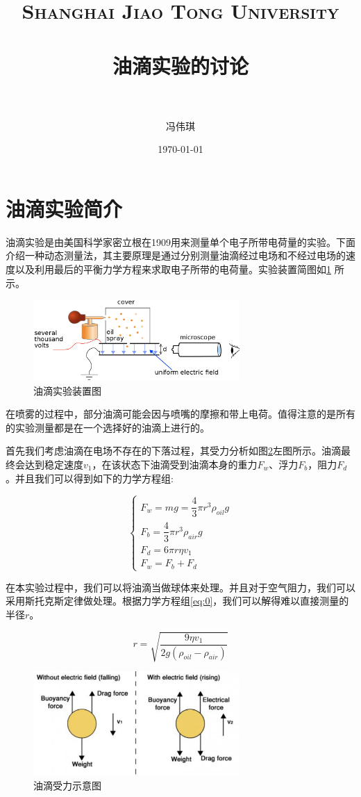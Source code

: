 \documentclass[paper=a4, fontsize=11pt]{scrartcl} %
\title{	
\normalfont \normalsize 
\textsc{Shanghai Jiao Tong University} \\ [25pt] %
\horrule{0.5pt} \\[0.4cm] %
\huge \kaishu 油滴实验的讨论 \\ %
\horrule{2pt} \\[0.5cm] %
}
\author{\kaishu 冯伟琪} %
\date{\normalsize\today} %
\numberwithin{equation}{section} %
\numberwithin{figure}{section} %
\numberwithin{table}{section} %
\begin{document}
\maketitle %
\section{\kaishu 油滴实验简介}
\kaishu 
油滴实验是由美国科学家密立根在1909用来测量单个电子所带电荷量的实验。下面介绍一种动态测量法，其主要原理是通过分别测量油滴经过电场和不经过电场的速度以及利用最后的平衡力学方程来求取电子所带的电荷量。实验装置简图如\ref{fig:0} 所示。

\begin{figure}[!htp]
	\centering
	\includegraphics[width=0.7\textwidth]{fig0}
	\caption{\kaishu 油滴实验装置图}
	\label{fig:0}
\end{figure}

在喷雾的过程中，部分油滴可能会因与喷嘴的摩擦和带上电荷。值得注意的是所有的实验测量都是在一个选择好的油滴上进行的。

首先我们考虑油滴在电场不存在的下落过程，其受力分析如图\ref{fig:1}左图所示。油滴最终会达到稳定速度$v_1$，在该状态下油滴受到油滴本身的重力$F_{w}$、浮力$F_{b}$，阻力$F_{d}$。并且我们可以得到如下的力学方程组:

\begin{equation}
	\begin{cases}
		F_w = mg = \dfrac{4}{3}\pi r^3 \rho_{oil}g\\
		F_b = \dfrac{4}{3} \pi r^3 \rho_{air} g\\
		F_d = 6\pi r \eta v_1\\
		F_w=F_b+F_d
	\end{cases}
	\label{eq:0}
\end{equation}

在本实验过程中，我们可以将油滴当做球体来处理。并且对于空气阻力，我们可以采用斯托克斯定律做处理。根据力学方程组\eqref{eq:0}，我们可以解得难以直接测量的半径$r$。

\begin{equation}
	r = \sqrt{\frac{9\eta v_1}{2g(\rho_{oil}-\rho_{air})}}
	\label{eq:1}
\end{equation}
\begin{figure}[!htp]
	\centering
	\includegraphics[width=0.7\textwidth]{1.png}
	\caption{\kaishu 油滴受力示意图}
	\label{fig:1}
\end{figure}
\end{document}
